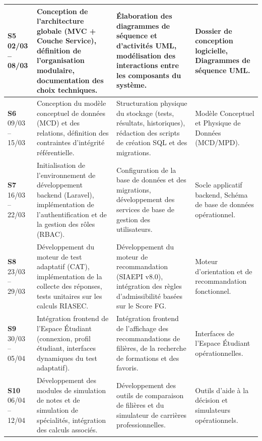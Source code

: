 \begin{longtable}{|p{1.5cm}|p{5.0cm}|p{5.0cm}|p{3.5cm}|}
\hline
\textbf{S5} \newline \scriptsize 02/03 -- 08/03 & Conception de l'architecture globale (MVC + Couche Service), définition de l'organisation modulaire, documentation des choix techniques. & Élaboration des diagrammes de séquence et d'activités UML, modélisation des interactions entre les composants du système. & Dossier de conception logicielle, Diagrammes de séquence UML. \\
\hline
\rowcolor{rowgray}
\textbf{S6} \newline \scriptsize 09/03 -- 15/03 & Conception du modèle conceptuel de données (MCD) et des relations, définition des contraintes d'intégrité référentielle. & Structuration physique du stockage (tests, résultats, historiques), rédaction des scripts de création SQL et des migrations. & Modèle Conceptuel et Physique de Données (MCD/MPD). \\
\hline
\textbf{S7} \newline \scriptsize 16/03 -- 22/03 & Initialisation de l'environnement de développement backend (Laravel), implémentation de l'authentification et de la gestion des rôles (RBAC). & Configuration de la base de données et des migrations, développement des services de base de gestion des utilisateurs. & Socle applicatif backend, Schéma de base de données opérationnel. \\
\hline
\rowcolor{rowgray}
\textbf{S8} \newline \scriptsize 23/03 -- 29/03 & Développement du moteur de test adaptatif (CAT), implémentation de la collecte des réponses, tests unitaires sur les calculs RIASEC. & Développement du moteur de recommandation (SIAEPI v8.0), intégration des règles d'admissibilité basées sur le Score FG. & Moteur d'orientation et de recommandation fonctionnel. \\
\hline
\textbf{S9} \newline \scriptsize 30/03 -- 05/04 & Intégration frontend de l'Espace Étudiant (connexion, profil étudiant, interfaces dynamiques du test adaptatif). & Intégration frontend de l'affichage des recommandations de filières, de la recherche de formations et des favoris. & Interfaces de l'Espace Étudiant opérationnelles. \\
\hline
\rowcolor{rowgray}
\textbf{S10} \newline \scriptsize 06/04 -- 12/04 & Développement des modules de simulation de notes et de simulation de spécialités, intégration des calculs associés. & Développement des outils de comparaison de filières et du simulateur de carrières professionnelles. & Outils d'aide à la décision et simulateurs opérationnels. \\

\end{longtable}
